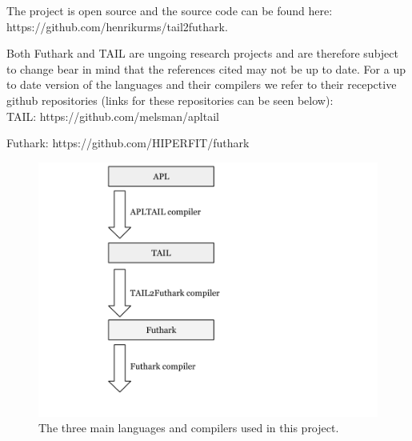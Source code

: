 \documentclass[11pt]{article}
\begin{document}
The project is open source and the source code can be found here:\\ https://github.com/henrikurms/tail2futhark.

Both Futhark and TAIL are ungoing research projects and are therefore subject to change bear in mind that the references cited may not be up to date. For a up to date version of the languages and their compilers we refer to their recepctive github repositories (links for these repositories can be seen below): \\

TAIL: https://github.com/melsman/apltail

Futhark: https://github.com/HIPERFIT/futhark


\begin{figure}
\label{fig:compilers}
\begin{center}
    \includegraphics[width=12cm]{compilers.png}
    \caption{The three main languages and compilers used in this project.}
\end{center}
\end{figure}

\end{document}
